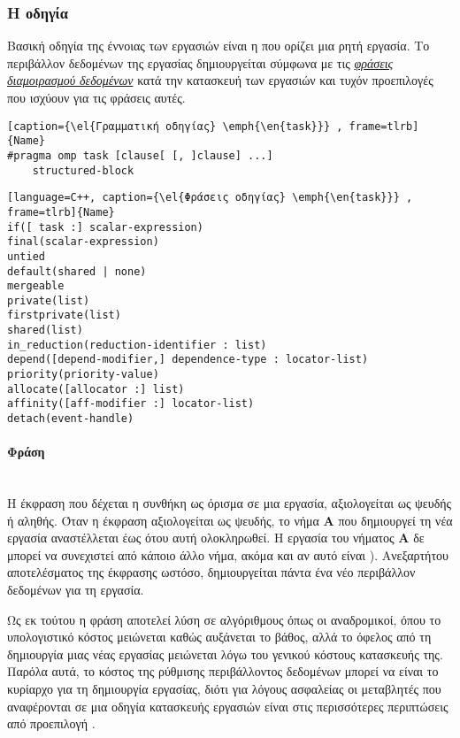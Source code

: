\subsubsection{Η οδηγία \emph{}}
Βασική οδηγία της έννοιας των εργασιών είναι η \textbf{} που ορίζει μια ρητή εργασία. Το περιβάλλον δεδομένων της εργασίας δημιουργείται σύμφωνα με τις \hyperref[sec:link]{\emph{φράσεις διαμοιρασμού δεδομένων}} κατά την
κατασκευή των εργασιών και τυχόν προεπιλογές που ισχύουν για τις φράσεις αυτές\cite{thenextstep20}.
	
\begin{spacing}{1.1}
\begin{lstlisting}[caption={\el{Γραμματική οδηγίας} \emph{\en{task}}} , frame=tlrb]{Name}
#pragma omp task [clause[ [, ]clause] ...] 
	structured-block 
\end{lstlisting}
\begin{lstlisting}[language=C++, caption={\el{Φράσεις οδηγίας} \emph{\en{task}}} , frame=tlrb]{Name}
if([ task :] scalar-expression) 
final(scalar-expression) 
untied 
default(shared | none) 
mergeable 
private(list) 
firstprivate(list) 
shared(list) 
in_reduction(reduction-identifier : list) 
depend([depend-modifier,] dependence-type : locator-list) 
priority(priority-value) 
allocate([allocator :] list) 
affinity([aff-modifier :] locator-list) 
detach(event-handle)
\end{lstlisting}
\end{spacing}
\paragraph{Φράση }
\ \\
Η έκφραση που δέχεται η συνθήκη \textbf{} ως όρισμα σε μια εργασία, αξιολογείται ως ψευδής ή αληθής. Όταν η έκφραση αξιολογείται ως ψευδής, το νήμα \textbf{A} που δημιουργεί τη νέα εργασία αναστέλλεται έως ότου αυτή ολοκληρωθεί. Η εργασία του νήματος \textbf{Α} δε μπορεί να συνεχιστεί από κάποιο άλλο νήμα, ακόμα και αν αυτό είναι )\cite{if_clause}.
Ανεξαρτήτου αποτελέσματος της έκφρασης ωστόσο,
δημιουργείται πάντα ένα νέο περιβάλλον δεδομένων για τη εργασία.

Ως εκ τούτου η φράση \emph{} αποτελεί λύση σε αλγόριθμους όπως οι αναδρομικοί, όπου το υπολογιστικό κόστος
μειώνεται καθώς αυξάνεται το βάθος, αλλά το όφελος από τη δημιουργία μιας νέας εργασίας μειώνεται λόγω του γενικού
κόστους κατασκευής της. Παρόλα αυτά, το κόστος της ρύθμισης περιβάλλοντος δεδομένων μπορεί να είναι το κυρίαρχο για τη
δημιουργία εργασίας, διότι για λόγους ασφαλείας οι μεταβλητές που αναφέρονται σε μια οδηγία κατασκευής εργασιών
είναι στις περισσότερες περιπτώσεις από προεπιλογή \emph{}\cite{parallel_dist}. 

